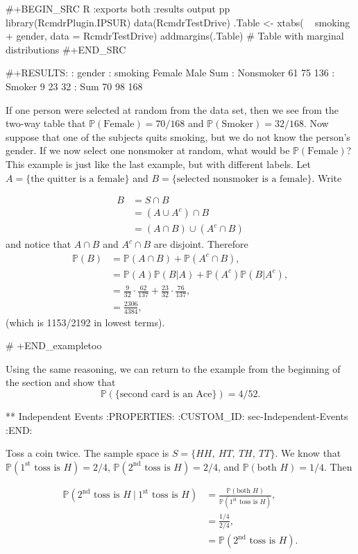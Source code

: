 #+BEGIN_SRC R :exports both :results output pp
library(RcmdrPlugin.IPSUR)
data(RcmdrTestDrive)  
.Table <- xtabs( ~ smoking + gender, data = RcmdrTestDrive)
addmargins(.Table) # Table with marginal distributions
#+END_SRC

#+RESULTS:
:            gender
: smoking     Female Male Sum
:   Nonsmoker     61   75 136
:   Smoker         9   23  32
:   Sum           70   98 168

If one person were selected at random from the data set, then we see
from the two-way table that \(\mathbb{P}(\mbox{Female})=70/168\) and
\(\mathbb{P}(\mbox{Smoker})=32/168\). Now suppose that one of the
subjects quits smoking, but we do not know the person's gender. If we
now select one nonsmoker at random, what would be
\(\mathbb{P}(\mbox{Female})\)? This example is just like the last
example, but with different labels. Let \( A = \{ \mbox{the quitter is
a female} \} \) and \( B = \{ \mbox{selected nonsmoker is a female} \}
\). Write

\begin{align*}
B & =S\cap B\\
 & =(A\cup A^{c})\cap B\\
 & =(A\cap B)\cup(A^{c}\cap B)
\end{align*}
and notice that \(A\cap B\) and \(A^{c}\cap B\) are disjoint. Therefore
\begin{align*}
\mathbb{P}(B) & =\mathbb{P}(A\cap B)+\mathbb{P}(A^{c}\cap B),\\
 & =\mathbb{P}(A)\mathbb{P}(B|A)+\mathbb{P}(A^{c})\mathbb{P}(B|A^{c}),\\
 & =\frac{9}{32}\cdot\frac{62}{137}+\frac{23}{32}\cdot\frac{76}{137},\\
 & =\frac{2306}{4384},
\end{align*}
(which is 1153/2192 in lowest terms).

# +END_exampletoo

Using the same reasoning, we can return to the example from the
beginning of the section and show that 
\[ \mathbb{P}(\{ \mbox{second
card is an Ace} \} )=4/52.  
\]
 
** Independent Events
:PROPERTIES:
:CUSTOM_ID: sec-Independent-Events
:END:

Toss a coin twice. The sample space is \(S= \{ HH,\ HT,\ TH,\ TT \}
\). We know that \(\mathbb{P}(1^{\mathrm{st}}\mbox{ toss is }H)=2/4\),
\(\mathbb{P}(2^{\mathrm{nd}}\mbox{ toss is }H)=2/4\), and
\(\mathbb{P}(\mbox{both }H)=1/4\). Then

\begin{align*} 
\mathbb{P}(2^{\mathrm{nd}}\mbox{ toss is }H\ \vert \ 1^{\mathrm{st}}\mbox{ toss is }H) & =\frac{\mathbb{P}(\mbox{both }H)}{\mathbb{P}(1^{\mathrm{st}}\mbox{ toss is }H)}, \\
 & =\frac{1/4}{2/4},\\
 & =\mathbb{P}(2^{\mathrm{nd}}\mbox{ toss is }H).
\end{align*}

